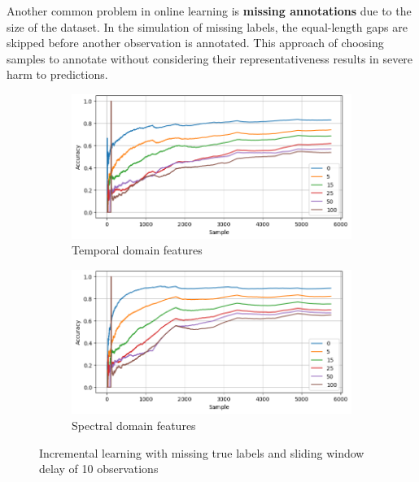 Another common problem in online learning is \textbf{missing annotations} due to the size of the dataset. In the simulation of missing labels, the equal-length gaps are skipped before another observation is annotated. This approach of choosing samples to annotate without considering their representativeness results in severe harm to predictions. 

\begin{figure}[ht]
    \centering
    \begin{subfigure}[b]{0.49\textwidth}
        \includegraphics[width=\textwidth]{assets/design/gradual-learning-skip-temporal-domain-fault.png}
        \caption{Temporal domain features}
    \end{subfigure}
    \hfill
    \begin{subfigure}[b]{0.49\textwidth}
        \includegraphics[width=\textwidth]{assets/design/gradual-learning-skip-spectral-domain-fault.png}
        \caption{Spectral domain features}
    \end{subfigure}
    \caption{Incremental learning with missing true labels and sliding window delay of 10 observations}
    \label{fig:design:online-label-skip}
\end{figure}
 

